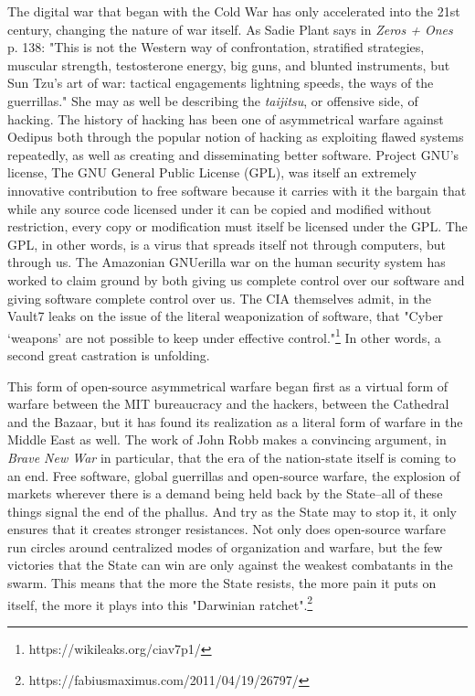 \documentclass[12pt, a5paper, twoside, openright]{memoir}
\begin{document}
The digital war that began with the Cold War has only accelerated into the 21st century, changing the nature of war itself. As Sadie Plant says in \textit{Zeros + Ones} p. 138: "This is not the Western way of confrontation, stratified strategies, muscular strength, testosterone energy, big guns, and blunted instruments, but Sun Tzu's art of war: tactical engagements lightning speeds, the ways of the guerrillas." She may as well be describing the \textit{taijitsu}, or offensive side, of hacking. The history of hacking has been one of asymmetrical warfare against Oedipus both through the popular notion of hacking as exploiting flawed systems repeatedly, as well as creating and disseminating better software. Project GNU's license, The GNU General Public License (GPL), was itself an extremely innovative contribution to free software because it carries with it the bargain that while any source code licensed under it can be copied and modified without restriction, every copy or modification must itself be licensed under the GPL. The GPL, in other words, is a virus that spreads itself not through computers, but through us. The Amazonian GNUerilla war on the human security system has worked to claim ground by both giving us complete control over our software and giving software complete control over us. The CIA themselves admit, in the Vault7 leaks on the issue of the literal weaponization of software, that "Cyber ‘weapons' are not possible to keep under effective control."\footnote{https://wikileaks.org/ciav7p1/} In other words, a second great castration is unfolding.

This form of open-source asymmetrical warfare began first as a virtual form of warfare between the MIT bureaucracy and the hackers, between the Cathedral and the Bazaar, but it has found its realization as a literal form of warfare in the Middle East as well. The work of John Robb makes a convincing argument, in \textit{Brave New War} in particular, that the era of the nation-state itself is coming to an end. Free software, global guerrillas and open-source warfare, the explosion of markets wherever there is a demand being held back by the State--all of these things signal the end of the phallus. And try as the State may to stop it, it only ensures that it creates stronger resistances. Not only does open-source warfare run circles around centralized modes of organization and warfare, but the few victories that the State can win are only against the weakest combatants in the swarm. This means that the more the State resists, the more pain it puts on itself, the more it plays into this "Darwinian ratchet".\footnote{https://fabiusmaximus.com/2011/04/19/26797/}
\end{document}
